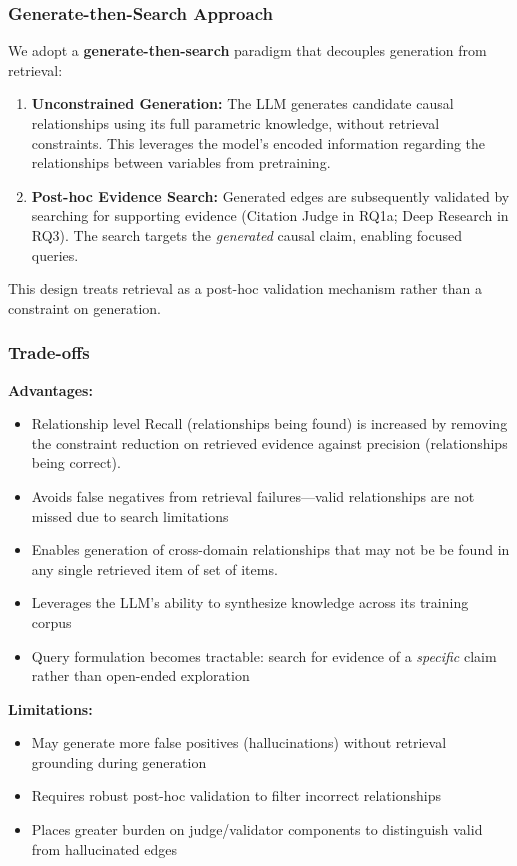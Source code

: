 \subsubsection{Generate-then-Search Approach}

We adopt a \textbf{generate-then-search} paradigm that decouples generation from retrieval:

\begin{enumerate}[noitemsep]
    \item \textbf{Unconstrained Generation:} The LLM generates candidate causal relationships using its full parametric knowledge, without retrieval constraints. This leverages the model's encoded information regarding the relationships between variables from pretraining.
    \item \textbf{Post-hoc Evidence Search:} Generated edges are subsequently validated by searching for supporting evidence (Citation Judge in RQ1a; Deep Research in RQ3). The search targets the \textit{generated} causal claim, enabling focused queries.
\end{enumerate}

This design treats retrieval as a post-hoc validation mechanism rather than a constraint on generation. 

\subsubsection{Trade-offs}

\textbf{Advantages:}
\begin{itemize}[noitemsep]
    \item Relationship level Recall (relationships being found) is increased by removing the constraint reduction on retrieved evidence against precision (relationships being correct).
    \item Avoids false negatives from retrieval failures---valid relationships are not missed due to search limitations
    \item Enables generation of cross-domain relationships that may not be be found in any single retrieved item of set of items.
    \item Leverages the LLM's ability to synthesize knowledge across its training corpus
    \item Query formulation becomes tractable: search for evidence of a \textit{specific} claim rather than open-ended exploration
\end{itemize}

\textbf{Limitations:}
\begin{itemize}[noitemsep]
    \item May generate more false positives (hallucinations) without retrieval grounding during generation
    \item Requires robust post-hoc validation to filter incorrect relationships
    \item Places greater burden on judge/validator components to distinguish valid from hallucinated edges
\end{itemize}


